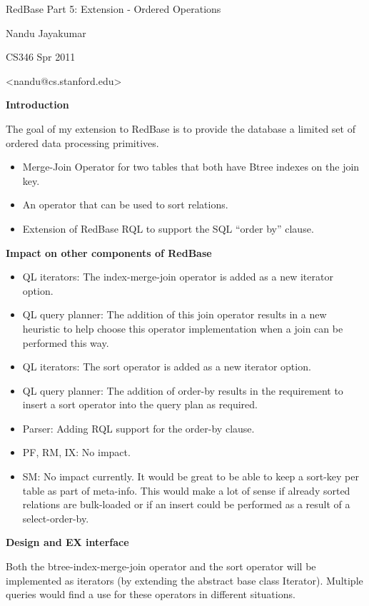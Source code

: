 \documentclass[letterpaper,11pt]{article}
\newcommand{\resitem}[1]{\item #1 \vspace{-2pt}}
\newcommand{\resheading}[1]{{\vspace{0.1in}\large {\textbf{\textsf{#1 \vphantom{p\^{E}}}}}}}
\begin{document}
\textsf{\LARGE RedBase Part 5: Extension - Ordered Operations}\\[1cm]

\vspace{0.1in}

\begin{description}
\item Nandu Jayakumar
\item CS346 Spr 2011
\item <nandu@cs.stanford.edu>

\end{description}


\resheading{Introduction}

The goal of my extension to RedBase is to provide the database a limited set of ordered
data processing primitives. 
  \begin{itemize}
   \resitem{Merge-Join Operator for two tables that both have Btree indexes on
    the join key.}
   \resitem{An operator that can be used to sort relations.}
   \resitem{Extension of RedBase RQL to support the SQL ``order by'' clause.}
  \end{itemize}


\resheading{Impact on other components of RedBase}
 \begin{itemize}
   \resitem{QL iterators: The index-merge-join operator is added as a new
     iterator option.}
   \resitem{QL query planner: The addition of this join operator results in a 
    new heuristic to help choose this operator implementation when a join can be
    performed this way.}
  \resitem{QL iterators: The sort operator is added as a new iterator option.}
   \resitem{QL query planner: The addition of order-by results in the
    requirement to insert a sort operator into the query plan as required.}
   \resitem{Parser: Adding RQL support for the order-by clause.}
   \resitem{PF, RM, IX: No impact.}
   \resitem{SM: No impact currently. It would be great to be able to keep a
     sort-key per table as part of meta-info. This would make a lot of sense if
     already sorted relations are bulk-loaded or if an insert could be performed
   as a result of a select-order-by.}

  \end{itemize}


\resheading{Design and EX interface}

Both the btree-index-merge-join operator and the sort operator will be
implemented as iterators (by extending the abstract base class
Iterator). Multiple queries would find a use for these operators in different
situations.
\end{document}
